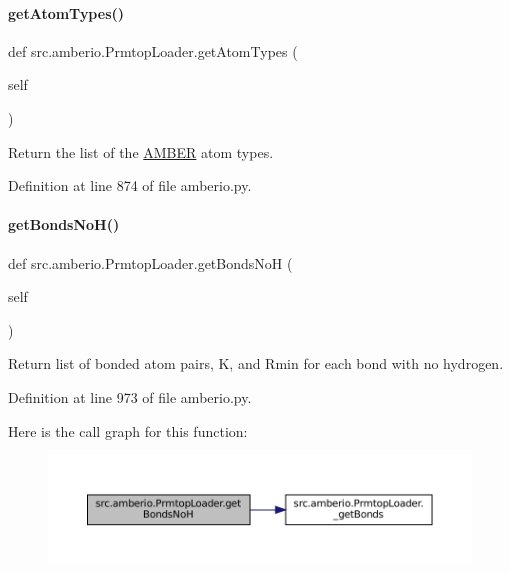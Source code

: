 \paragraph{\texorpdfstring{get\+Atom\+Types()}{getAtomTypes()}}
{\footnotesize\ttfamily def src.\+amberio.\+Prmtop\+Loader.\+get\+Atom\+Types (\begin{DoxyParamCaption}\item[{}]{self }\end{DoxyParamCaption})}



Return the list of the \hyperlink{classsrc_1_1amberio_1_1AMBER}{A\+M\+B\+ER} atom types. 



Definition at line 874 of file amberio.\+py.

\mbox{\label{classsrc_1_1amberio_1_1PrmtopLoader_af8e39923b6f949eb7db0264b4e26a2c5}} 
\paragraph{\texorpdfstring{get\+Bonds\+No\+H()}{getBondsNoH()}}
{\footnotesize\ttfamily def src.\+amberio.\+Prmtop\+Loader.\+get\+Bonds\+NoH (\begin{DoxyParamCaption}\item[{}]{self }\end{DoxyParamCaption})}



Return list of bonded atom pairs, K, and Rmin for each bond with no hydrogen. 



Definition at line 973 of file amberio.\+py.

Here is the call graph for this function\+:
\nopagebreak
\begin{figure}[H]
\begin{center}
\leavevmode
\includegraphics[width=350pt]{classsrc_1_1amberio_1_1PrmtopLoader_af8e39923b6f949eb7db0264b4e26a2c5_cgraph}
\end{center}
\end{figure}
\mbox{\label{classsrc_1_1amberio_1_1PrmtopLoader_ab75f7fa3f828685a1959e8c0f270f3ec}} 
